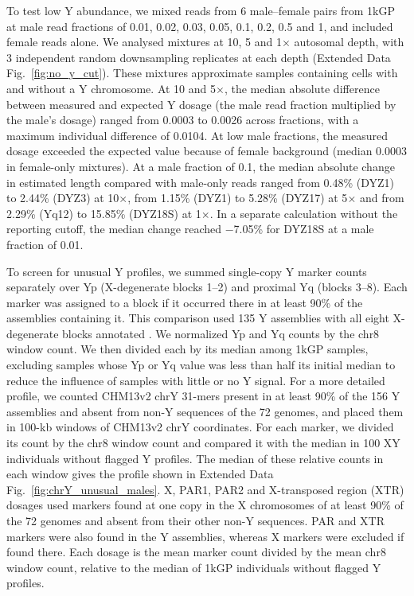 To test low Y abundance, we mixed reads from 6 male--female pairs from 1kGP at male read fractions of 0.01, 0.02, 0.03, 0.05, 0.1, 0.2, 0.5 and 1, and included female reads alone. We analysed mixtures at 10, 5 and 1$\times$ autosomal depth, with 3 independent random downsampling replicates at each depth (Extended Data Fig.~\ref{fig:no_y_cut}). These mixtures approximate samples containing cells with and without a Y chromosome. At 10 and 5$\times$, the median absolute difference between measured and expected Y dosage (the male read fraction multiplied by the male's dosage) ranged from 0.0003 to 0.0026 across fractions, with a maximum individual difference of 0.0104. At low male fractions, the measured dosage exceeded the expected value because of female background (median 0.0003 in female-only mixtures). At a male fraction of 0.1, the median absolute change in estimated length compared with male-only reads ranged from 0.48\% (DYZ1) to 2.44\% (DYZ3) at 10$\times$, from 1.15\% (DYZ1) to 5.28\% (DYZ17) at 5$\times$ and from 2.29\% (Yq12) to 15.85\% (DYZ18S) at 1$\times$. In a separate calculation without the reporting cutoff, the median change reached $-$7.05\% for DYZ18S at a male fraction of 0.01.

To screen for unusual Y profiles, we summed single-copy Y marker counts separately over Yp (X-degenerate blocks 1--2) and proximal Yq (blocks 3--8). Each marker was assigned to a block if it occurred there in at least 90\% of the assemblies containing it. This comparison used 135 Y assemblies with all eight X-degenerate blocks annotated \cite{Hallast2026}. We normalized Yp and Yq counts by the chr8 window count. We then divided each by its median among 1kGP samples, excluding samples whose Yp or Yq value was less than half its initial median to reduce the influence of samples with little or no Y signal. For a more detailed profile, we counted CHM13v2 chrY 31-mers present in at least 90\% of the 156 Y assemblies and absent from non-Y sequences of the 72 genomes, and placed them in 100-kb windows of CHM13v2 chrY coordinates. For each marker, we divided its count by the chr8 window count and compared it with the median in 100 XY individuals without flagged Y profiles. The median of these relative counts in each window gives the profile shown in Extended Data Fig.~\ref{fig:chrY_unusual_males}. X, PAR1, PAR2 and X-transposed region (XTR) dosages used markers found at one copy in the X chromosomes of at least 90\% of the 72 genomes and absent from their other non-Y sequences. PAR and XTR markers were also found in the Y assemblies, whereas X markers were excluded if found there. Each dosage is the mean marker count divided by the mean chr8 window count, relative to the median of 1kGP individuals without flagged Y profiles.

